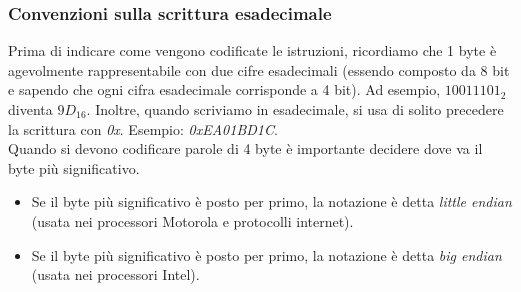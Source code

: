 \documentclass[class=book, crop=false]{standalone}
\begin{document}
\subsubsection{Convenzioni sulla scrittura esadecimale}
Prima di indicare come vengono codificate le istruzioni, ricordiamo che 1 byte è agevolmente rappresentabile con due cifre esadecimali (essendo composto da 8 bit e sapendo che ogni cifra esadecimale corrisponde a 4 bit). Ad esempio, \(1001 1101_{2}\) diventa \(9D_{16}\). Inoltre, quando scriviamo in esadecimale, si usa di solito precedere la scrittura con \emph{0x}. Esempio: \emph{0xEA01BD1C}.\\
Quando si devono codificare parole di 4 byte è importante decidere dove va il byte più significativo.
\begin{itemize}[nolistsep]
	\item Se il byte più significativo è posto per primo, la notazione è detta \emph{little endian} (usata nei processori Motorola e protocolli internet).
	\item Se il byte più significativo è posto per primo, la notazione è detta \emph{big endian} (usata nei processori Intel).
\end{itemize}
\end{document}

